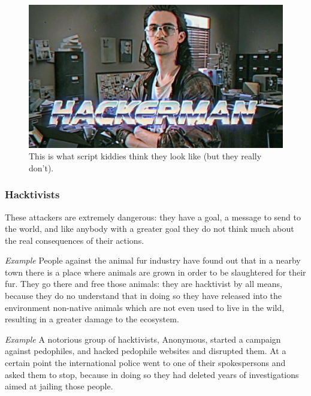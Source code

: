 \begin{figure}[h]
    \centering
    \includegraphics[scale=0.2]{img/hackerman.png}
    \decoRule
    \caption{This is what script kiddies think they look like (but they really don't).}
    \label{fig:hackerman_attacks}
\end{figure}


\subsubsection*{Hacktivists}
These attackers are extremely dangerous: they have a goal, a message to send to the world, and like anybody with a greater goal they do not think much about the real consequences of their actions.

\vspace{0.5em}

\emph{Example} People against the animal fur industry have found out that in a nearby town there is a place where animals are grown in order to be slaughtered for their fur. They go there and free those animals: they are hacktivist by all means, because they do no understand that in doing so they have released into the environment non-native animals which are not even used to live in the wild, resulting in a greater damage to the ecosystem.

\vspace{0.5em}

\emph{Example} A notorious group of hacktivists, Anonymous, started a campaign against pedophiles, and hacked pedophile websites and disrupted them. At a certain point the international police went to one of their spokespersons and asked them to stop, because in doing so they had deleted years of investigations aimed at jailing those people.

